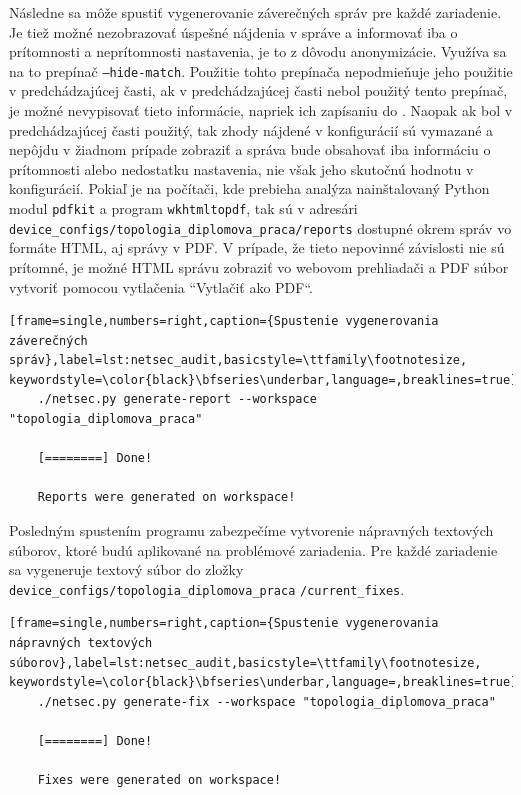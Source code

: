 \vspace{2em}
Následne sa môže spustiť vygenerovanie záverečných správ pre každé zariadenie. Je tiež možné nezobrazovať úspešné nájdenia v správe a informovať iba o prítomnosti a neprítomnosti nastavenia, je to z dôvodu anonymizácie. Využíva sa na to prepínač \texttt{---hide-match}. Použitie tohto prepínača nepodmieňuje jeho použitie v predchádzajúcej časti, ak v predchádzajúcej časti nebol použitý tento prepínač, je možné nevypisovať tieto informácie, napriek ich zapísaniu do . Naopak ak bol v predchádzajúcej časti použitý, tak zhody nájdené v konfigurácií sú vymazané a nepôjdu v žiadnom prípade zobraziť a správa bude obsahovať iba informáciu o prítomnosti alebo nedostatku nastavenia, nie však jeho skutočnú hodnotu v konfigurácií. Pokiaľ je na počítači, kde prebieha analýza nainštalovaný Python modul \texttt{pdfkit} a program \texttt{wkhtmltopdf}, tak sú v adresári \texttt{device\_configs/topologia\_diplomova\_praca/reports} dostupné okrem správ vo formáte HTML, aj správy v PDF. V prípade, že tieto nepovinné závislosti nie sú prítomné, je možné HTML správu zobraziť vo webovom prehliadači a PDF súbor vytvoriť pomocou vytlačenia ``Vytlačiť ako PDF``.

\begin{minipage}{\linewidth}		
	\begin{lstlisting}[frame=single,numbers=right,caption={Spustenie vygenerovania záverečných správ},label=lst:netsec_audit,basicstyle=\ttfamily\footnotesize, keywordstyle=\color{black}\bfseries\underbar,language=,breaklines=true]
	./netsec.py generate-report --workspace "topologia_diplomova_praca"
	
	[========] Done!
	
	Reports were generated on workspace!
	\end{lstlisting}
\end{minipage}
\newpage
\vspace{2em}
Posledným spustením programu zabezpečíme vytvorenie nápravných textových súborov, ktoré budú aplikované na problémové zariadenia. Pre každé zariadenie sa vygeneruje textový súbor do zložky \texttt{device\_configs/topologia\_diplomova\_praca} \texttt{/current\_fixes}.

\begin{minipage}{\linewidth}		
	\begin{lstlisting}[frame=single,numbers=right,caption={Spustenie vygenerovania nápravných textových súborov},label=lst:netsec_audit,basicstyle=\ttfamily\footnotesize, keywordstyle=\color{black}\bfseries\underbar,language=,breaklines=true]
	./netsec.py generate-fix --workspace "topologia_diplomova_praca"
	
	[========] Done!
	
	Fixes were generated on workspace!
	\end{lstlisting}
\end{minipage}


